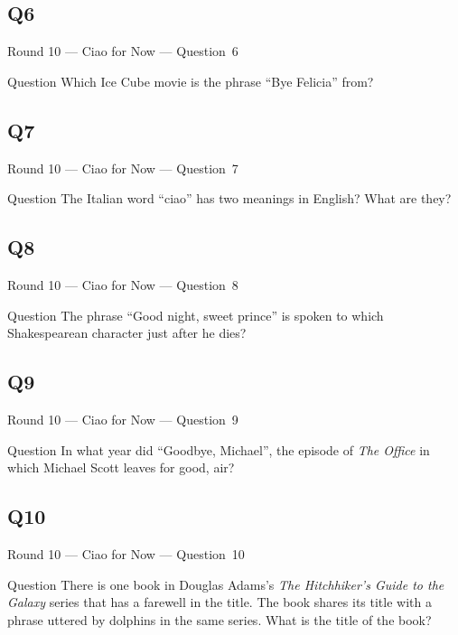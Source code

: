 \documentclass[11pt]{beamer}
\begin{document}
\subsection*{Q6}
\begin{frame}[t]{Round 10 --- Ciao for Now --- \mbox{Question 6}}
\vspace{-0.5em}
\begin{block}{Question}
Which Ice Cube movie is the phrase ``Bye Felicia'' from?
\end{block}
\end{frame}
\subsection*{Q7}
\begin{frame}[t]{Round 10 --- Ciao for Now --- \mbox{Question 7}}
\vspace{-0.5em}
\begin{block}{Question}
The Italian word ``ciao'' has two meanings in English? What are they? 
\end{block}
\end{frame}
\subsection*{Q8}
\begin{frame}[t]{Round 10 --- Ciao for Now --- \mbox{Question 8}}
\vspace{-0.5em}
\begin{block}{Question}
The phrase ``Good night, sweet prince'' is spoken to which Shakespearean character just after he dies?
\end{block}
\end{frame}
\subsection*{Q9}
\begin{frame}[t]{Round 10 --- Ciao for Now --- \mbox{Question 9}}
\vspace{-0.5em}
\begin{block}{Question}
In what year did ``Goodbye, Michael'', the episode of \emph{The Office} in which Michael Scott leaves for good, air?
\end{block}
\end{frame}
\subsection*{Q10}
\begin{frame}[t]{Round 10 --- Ciao for Now --- \mbox{Question 10}}
\vspace{-0.5em}
\begin{block}{Question}
There is one book in Douglas Adams's \emph{The Hitchhiker's Guide to the Galaxy} series that has a farewell in the title.  The book shares its title with a phrase uttered by dolphins in the same series. What is the title of the book?
\end{block}
\end{frame}
\end{document}
